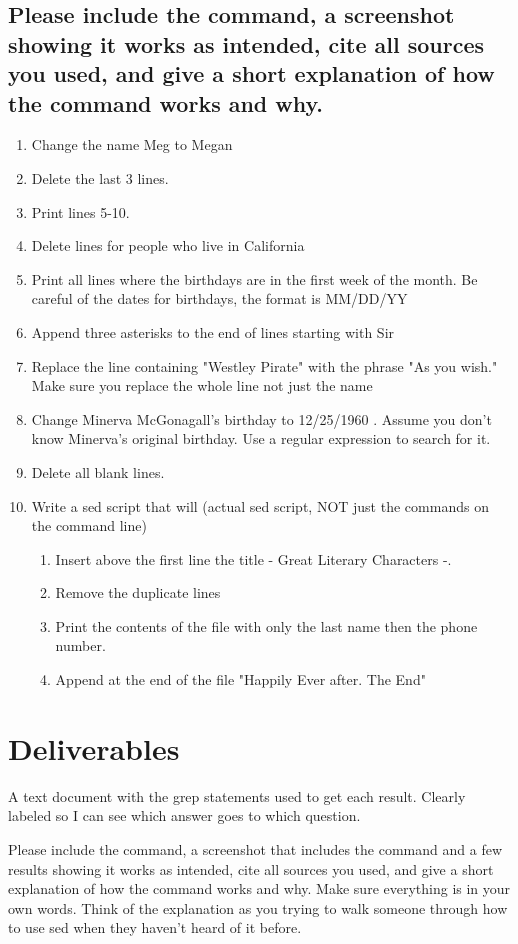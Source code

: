 \documentclass[12pt]{article}
\begin{document}
\subsection*{Please include the command, a screenshot showing it works as intended, cite all sources you used, and give a short explanation of how the command works and why.}
    \begin{enumerate}
        \item Change the name Meg to Megan
        \item Delete the last  3 lines.
        \item Print lines 5-10.
        \item Delete lines for people who live in California
        \item Print all lines where the birthdays are in the first week of the month.  Be careful of the dates for birthdays, the format is MM/DD/YY
        \item Append three asterisks to the end of lines starting with Sir
        \item Replace the line containing "Westley Pirate" with the phrase "As you wish."  Make sure you replace the whole line not just the name
        \item Change Minerva McGonagall's birthday to 12/25/1960 . Assume you don't know Minerva's original birthday. Use a regular expression to search for it.
        \item Delete all blank lines.
        \item Write a sed script that will  (actual sed script, NOT just the commands on the command line)
        \begin{enumerate}
            \item Insert above the first line the title  - Great Literary Characters -.
            \item Remove the duplicate lines
            \item Print the contents of the file with only the last name then the phone number.
            \item Append at the end of the file "Happily Ever after. The End"
        \end{enumerate}


    \end{enumerate}



\section*{Deliverables}
A text document with the grep statements used to get each result.  Clearly labeled so I can see which answer goes to which question.


Please include the command, a screenshot that includes the command and a few results showing it works as intended, cite all sources you used, and give a short explanation of how the command works and why. Make sure everything is in your own words.  Think of the explanation as you trying to walk someone through how to use sed when they haven't heard of it before.
\end{document}

